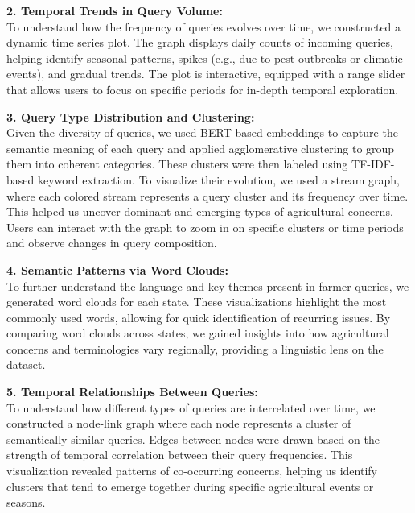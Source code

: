 \documentclass[a4paper, 12pt]{article}
\begin{document}
\vspace{0.5em}
\textbf{2. Temporal Trends in Query Volume:} \\
To understand how the frequency of queries evolves over time, we constructed a dynamic time series plot. The graph displays daily counts of incoming queries, helping identify seasonal patterns, spikes (e.g., due to pest outbreaks or climatic events), and gradual trends. The plot is interactive, equipped with a range slider that allows users to focus on specific periods for in-depth temporal exploration.

\vspace{0.5em}
\textbf{3. Query Type Distribution and Clustering:} \\
Given the diversity of queries, we used BERT-based embeddings to capture the semantic meaning of each query and applied agglomerative clustering to group them into coherent categories. These clusters were then labeled using TF-IDF-based keyword extraction. To visualize their evolution, we used a stream graph, where each colored stream represents a query cluster and its frequency over time. This helped us uncover dominant and emerging types of agricultural concerns. Users can interact with the graph to zoom in on specific clusters or time periods and observe changes in query composition.

\vspace{0.5em}
\textbf{4. Semantic Patterns via Word Clouds:} \\
To further understand the language and key themes present in farmer queries, we generated word clouds for each state. These visualizations highlight the most commonly used words, allowing for quick identification of recurring issues. By comparing word clouds across states, we gained insights into how agricultural concerns and terminologies vary regionally, providing a linguistic lens on the dataset.

\vspace{0.5em}
\textbf{5. Temporal Relationships Between Queries:} \\
To understand how different types of queries are interrelated over time, we constructed a node-link graph where each node represents a cluster of semantically similar queries. Edges between nodes were drawn based on the strength of temporal correlation between their query frequencies. This visualization revealed patterns of co-occurring concerns, helping us identify clusters that tend to emerge together during specific agricultural events or seasons.
\end{document}
